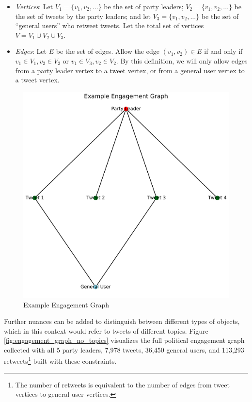 \begin{itemize}
  \item \emph{Vertices}: Let $V_{1}=\{v_{1},v_{2},\dots\}$ be the set of
  party leaders; $V_{2}=\{v_{1},v_{2},\dots\}$ be the set of tweets by the
  party leaders; and let
  $V_{3}=\{v_{1},v_{2},\dots\}$ be the set of ``general users'' who
  retweet tweets. Let the total set of vertices $V=V_{1}\cup V_{2}\cup V_{3}$.
  
  \item \emph{Edges}: Let $E$ be the set of edges. Allow the edge $(v_{1},
  v_{2})\in E$ if and only if $v_{1}\in V_{1}, v_{2}\in V_{2}$ or $v_{1}\in
  V_{3}, v_{2}\in V_{2}$. By this definition, we will only allow edges from a
  party leader vertex to a tweet vertex, or from a general user vertex to a
  tweet vertex.
\end{itemize}

\begin{figure}[h!]
  \centering
  \includegraphics[scale=0.2]{figures/ex_engagement_graph}
  \caption[Example Engagement Graph]{Example Engagement Graph}
  \label{fig:ex_engagement_graph}
\end{figure}

Further nuances can be added to distinguish between different types of objects,
which in this context would refer to tweets of different topics. Figure
\ref{fig:engagement_graph_no_topics}  visualizes the full political engagement
graph collected with all 5 party leaders, 7,978 tweets, 36,450 general users,
and 113,293 retweets\footnote{The number of retweets is equivalent to the number
of edges from tweet vertices to general user vertices.} built with these constraints.

